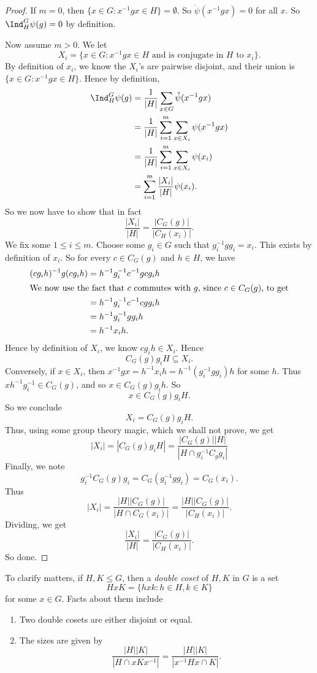 \documentclass[a4paper]{article}
\begin{document}
\begin{proof}
  If $m = 0$, then $\{x \in G: x^{-1}gx \in H\} = \emptyset$. So $\mathring{\psi}(x^{-1}gx) = 0$ for all $x$. So $\Ind_H^G \psi(g) = 0$ by definition.

  Now assume $m > 0$. We let
  \[
    X_i = \{x \in G: x^{-1}gx \in H\text{ and is conjugate in $H$ to $x_i$}\}.
  \]
  By definition of $x_i$, we know the $X_i$'s are pairwise disjoint, and their union is $\{x \in G: x^{-1}gx \in H\}$. Hence by definition,
  \begin{align*}
    \Ind_H^G \psi(g) &= \frac{1}{|H|} \sum_{x \in G} \mathring{\psi}(x^{-1}gx) \\
    &= \frac{1}{|H|}\sum_{i = 1}^m \sum_{x \in X_i} \psi(x^{-1}gx)\\
    &= \frac{1}{|H|}\sum_{i = 1}^m \sum_{x \in X_i} \psi(x_i)\\
    &= \sum_{i = 1}^m \frac{|X_i|}{|H|} \psi(x_i).
  \end{align*}
  So we now have to show that in fact
  \[
    \frac{|X_i|}{|H|} = \frac{|C_G(g)|}{|C_H(x_i)|}.
  \]
  We fix some $1 \leq i \leq m$. Choose some $g_i \in G$ such that $g_i^{-1} gg_i = x_i$. This exists by definition of $x_i$. So for every $c \in C_G(g)$ and $h \in H$, we have
  \begin{align*}
    (cg_i h)^{-1} g(cg_i h) &= h^{-1} g_i^{-1} c^{-1}gcg_i h \\
    \intertext{We now use the fact that $c$ commutes with $g$, since $c \in C_G (g)$, to get}
    &= h^{-1}g_i^{-1} c^{-1}cg g_ih \\
    &= h^{-1} g_i^{-1}gg_i h \\
    &= h^{-1} x_i h.
  \end{align*}
  Hence by definition of $X_i$, we know $cg_i h \in X_i$. Hence
  \[
    C_G(g) g_i H \subseteq X_i.
  \]
  Conversely, if $x \in X_i$, then $x^{-1}gx = h^{-1} x_i h = h^{-1}(g_i^{-1}g g_i) h$ for some $h$. Thus $xh^{-1}g_i^{-1} \in C_G(g)$, and so $x \in C_G(g) g_i h$. So
  \[
    x \in C_G(g) g_i H.
  \]
  So we conclude
  \[
    X_i = C_G(g) g_i H.
  \]
  Thus, using some group theory magic, which we shall not prove, we get
  \[
    |X_i| = |C_G(g) g_iH| = \frac{|C_G(g)||H|}{|H \cap g_i^{-1}C_g g_i|}
  \]
  Finally, we note
  \[
    g_i^{-1}C_G(g) g_i = C_G(g_i^{-1} gg_i) = C_G(x_i).
  \]
  Thus
  \[
    |X_i| = \frac{|H||C_G(g)|}{|H\cap C_G(x_i)|} = \frac{|H||C_G(g)|}{|C_H(x_i)|}.
  \]
  Dividing, we get
  \[
    \frac{|X_i|}{|H|} = \frac{|C_G(g)|}{|C_H(x_i)|}.
  \]
  So done.
\end{proof}
To clarify matters, if $H, K \leq G$, then a \emph{double coset} of $H, K$ in $G$ is a set
\[
  HxK = \{hxk: h \in H, k \in K\}
\]
for some $x \in G$. Facts about them include
\begin{enumerate}
  \item Two double cosets are either disjoint or equal.
  \item The sizes are given by
    \[
      \frac{|H||K|}{|H\cap xKx^{-1}|} = \frac{|H||K|}{|x^{-1}Hx \cap K|}.
    \]
\end{enumerate}
\end{document}
